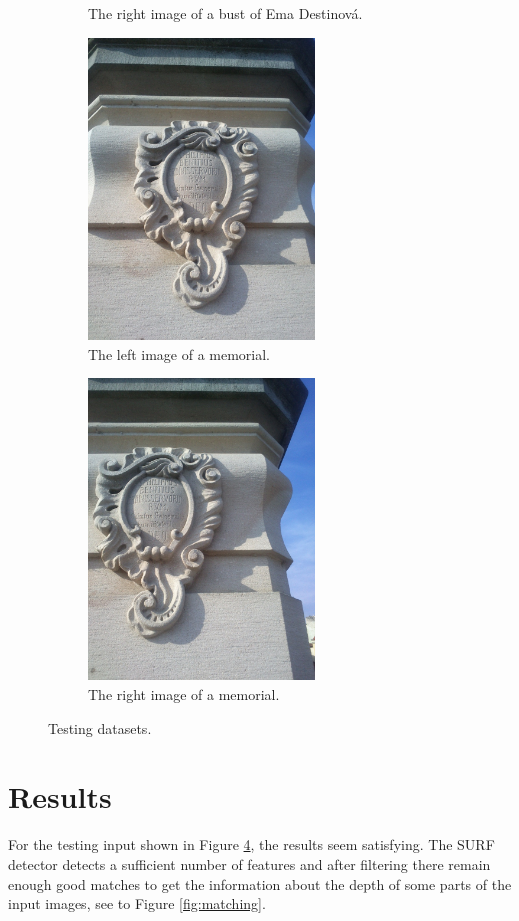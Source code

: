 \begin{figure}[H]
\begin{subfigure}[b]{0.45\textwidth}
\caption{The right image of a bust of Ema Destinová.} \label{2}
\end{subfigure}
\begin{subfigure}[b]{0.45\textwidth}
\centering
\includegraphics[width=6.0cm]{img/memorial_a.png}
\caption{The left image of a memorial.} \label{3}
\end{subfigure}
\begin{subfigure}[b]{0.45\textwidth}
\centering
\includegraphics[width=6.0cm]{img/memorial_b.png}
\caption{The right image of a memorial.} \label{4}
\end{subfigure}

\caption[]{Testing datasets.} 
\label{fig:input_samples}
\end{figure}

\section{Results}

For the testing input shown in Figure \ref{fig:input_samples}, the results seem satisfying. 
The SURF detector detects a sufficient number of features and after filtering there remain enough good matches to get the information about the depth of some parts of the input images, see to Figure \ref{fig:matching}.

